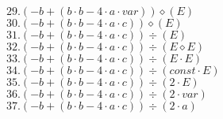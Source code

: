 \documentclass{article}
\begin{document}
\begin{enumerate}
\begin{multicols}{2}
				$29. (- b + (b \cdot b - 4 \cdot a \cdot var)) \diamond (E)$ \\
				$30. (- b + (b \cdot b - 4 \cdot a \cdot c)) \diamond (E)$ \\
				$31. (- b + (b \cdot b - 4 \cdot a \cdot c)) \div (E)$ \\
				$32. (- b + (b \cdot b - 4 \cdot a \cdot c)) \div (E \diamond E)$ \\
				$33. (- b + (b \cdot b - 4 \cdot a \cdot c)) \div (E \cdot E)$ \\
				$34. (- b + (b \cdot b - 4 \cdot a \cdot c)) \div (const \cdot E)$ \\
				$35. (- b + (b \cdot b - 4 \cdot a \cdot c)) \div (2 \cdot E)$ \\
				$36. (- b + (b \cdot b - 4 \cdot a \cdot c)) \div (2 \cdot var)$ \\
				$37. (- b + (b \cdot b - 4 \cdot a \cdot c)) \div (2 \cdot a)$ \\
			\end{multicols}


\end{enumerate}
\end{document}
